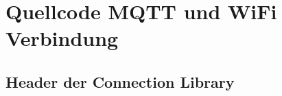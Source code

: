 \appendix
\let\stdsection\section
\renewcommand\section{\newpage\stdsection}
\renewcommand{\thesection}{\Alph{section}}
\renewcommand*{\sectionmark}[1]{\markright{\MakeMarkcase{Anhang \thesection: #1}}}




\section{Quellcode MQTT und WiFi Verbindung}\label{sec:bib_mqtt_wlan}

\subsection{Header der Connection Library}


